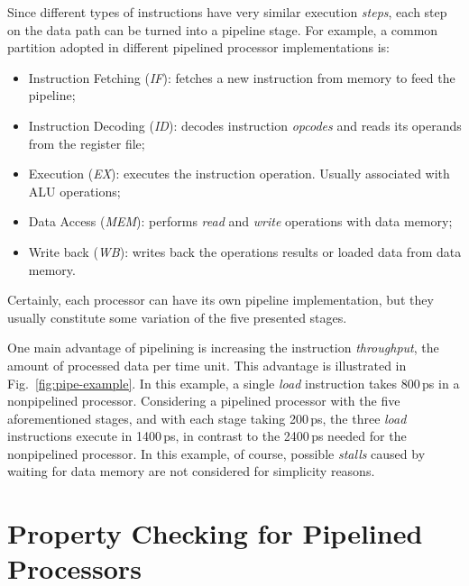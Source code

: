 Since different types of instructions have very similar execution \textit{steps}, each step on the data path can be turned into a pipeline stage. For example, a common partition adopted in different pipelined processor implementations is: 

\begin{itemize}
\item Instruction Fetching (\textit{IF}): fetches a new instruction from memory to feed the pipeline;
\item Instruction Decoding (\textit{ID}): decodes instruction \textit{opcodes} and reads its operands from the register file;
\item Execution (\textit{EX}): executes the instruction operation. Usually associated with ALU operations;
\item Data Access (\textit{MEM}): performs \textit{read} and \textit{write} operations with data memory;
\item Write back (\textit{WB}): writes back the operations results or loaded data from data memory.
\end{itemize}

Certainly, each processor can have its own pipeline implementation, but they usually constitute some variation of the five presented stages.

One main advantage of pipelining is increasing the instruction \textit{throughput}, the amount of processed data per time unit. This advantage is illustrated in Fig.~\ref{fig:pipe-example}. In this example, a single \textit{load} instruction takes 800\,ps in a nonpipelined processor. Considering a pipelined processor with the five aforementioned stages, and with each stage taking 200\,ps, the three \textit{load} instructions execute in 1400\,ps, in contrast to the 2400\,ps needed for the nonpipelined processor. In this example, of course, possible \textit{stalls} caused by waiting for data memory are not considered for simplicity reasons. 
 

\section{Property Checking for Pipelined Processors}
\label{section:ipc-pipe-processor}

